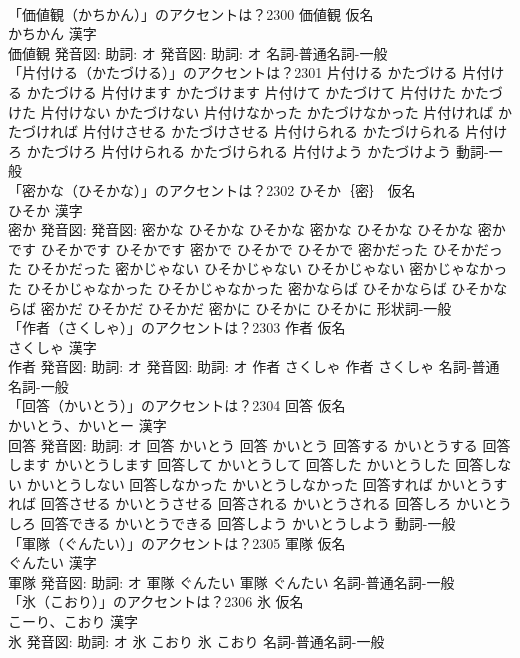 \documentclass[8pt]{extreport}
\begin{document}
\begin{CJK}{UTF8}{min}
\\	「価値観（かちかん）」のアクセントは？2300	価値観 仮名　
\\	かちかん 漢字　
\\	価値観 発音図: 助詞: オ 発音図: 助詞: オ							名詞-普通名詞-一般 
\\	「片付ける（かたづける）」のアクセントは？2301		片付ける かたづける		片付ける かたづける 片付けます かたづけます 片付けて かたづけて 片付けた かたづけた 片付けない かたづけない 片付けなかった かたづけなかった 片付ければ かたづければ 片付けさせる かたづけさせる 片付けられる かたづけられる 片付けろ かたづけろ 片付けられる かたづけられる 片付けよう かたづけよう				動詞-一般 
\\	「密かな（ひそかな）」のアクセントは？2302	ひそか｛密｝ 仮名　
\\	ひそか 漢字　
\\	密か 発音図: 発音図:	密かな ひそかな ひそかな		密かな ひそかな ひそかな 密かです ひそかです ひそかです 密かで ひそかで ひそかで 密かだった ひそかだった ひそかだった 密かじゃない ひそかじゃない ひそかじゃない 密かじゃなかった ひそかじゃなかった ひそかじゃなかった 密かならば ひそかならば ひそかならば 密かだ ひそかだ ひそかだ 密かに ひそかに ひそかに				形状詞-一般 
\\	「作者（さくしゃ）」のアクセントは？2303	作者 仮名　
\\	さくしゃ 漢字　
\\	作者 発音図: 助詞: オ 発音図: 助詞: オ	作者 さくしゃ		作者 さくしゃ				名詞-普通名詞-一般 
\\	「回答（かいとう）」のアクセントは？2304	回答 仮名　
\\	かいとう、かいとー 漢字　
\\	回答 発音図: 助詞: オ	回答 かいとう		回答 かいとう 回答する かいとうする 回答します かいとうします 回答して かいとうして 回答した かいとうした 回答しない かいとうしない 回答しなかった かいとうしなかった 回答すれば かいとうすれば 回答させる かいとうさせる 回答される かいとうされる 回答しろ かいとうしろ 回答できる かいとうできる 回答しよう かいとうしよう				動詞-一般 
\\	「軍隊（ぐんたい）」のアクセントは？2305	軍隊 仮名　
\\	ぐんたい 漢字　
\\	軍隊 発音図: 助詞: オ	軍隊 ぐんたい		軍隊 ぐんたい				名詞-普通名詞-一般 
\\	「氷（こおり）」のアクセントは？2306	氷 仮名　
\\	こーり、こおり 漢字　
\\	氷 発音図: 助詞: オ	氷 こおり		氷 こおり				名詞-普通名詞-一般 

\end{CJK}
\end{document}
